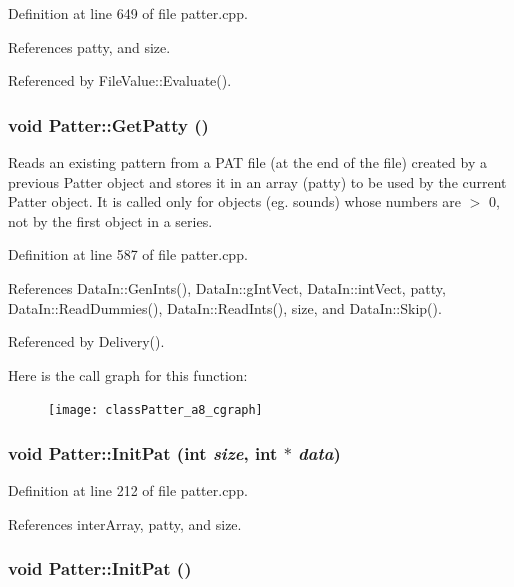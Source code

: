Definition at line 649 of file patter.cpp.

References patty, and size.

Referenced by File\-Value::Evaluate().
\subsubsection{\setlength{\rightskip}{0pt plus 5cm}void Patter::Get\-Patty ()}\label{classPatter_a8}


Reads an existing pattern from a PAT file (at the end of the file) created by a previous Patter object and stores it in an array (patty) to be used by the current Patter object. It is called only for objects (eg. sounds) whose numbers are $>$ 0, not by the first object in a series. 

Definition at line 587 of file patter.cpp.

References Data\-In::Gen\-Ints(), Data\-In::g\-Int\-Vect, Data\-In::int\-Vect, patty, Data\-In::Read\-Dummies(), Data\-In::Read\-Ints(), size, and Data\-In::Skip().

Referenced by Delivery().

Here is the call graph for this function:\begin{figure}[H]
\begin{center}
\leavevmode
\texttt{[image: classPatter\_a8\_cgraph]}
\end{center}
\end{figure}
\subsubsection{\setlength{\rightskip}{0pt plus 5cm}void Patter::Init\-Pat (int {\em size}, int $\ast$ {\em data})\hspace{0.3cm}{\tt  [private]}}\label{classPatter_d1}




Definition at line 212 of file patter.cpp.

References inter\-Array, patty, and size.
\subsubsection{\setlength{\rightskip}{0pt plus 5cm}void Patter::Init\-Pat ()\hspace{0.3cm}{\tt  [private]}}\label{classPatter_d0}


